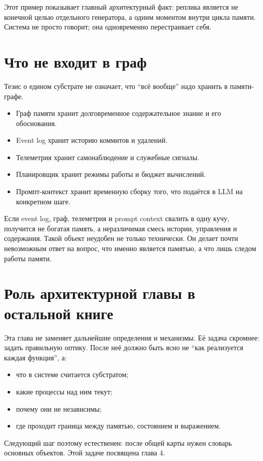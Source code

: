 Этот пример показывает главный архитектурный факт: реплика является не
конечной целью отдельного генератора, а одним моментом внутри цикла памяти.
Система не просто говорит; она одновременно перестраивает себя.

\section{Что не входит в граф}

Тезис о едином субстрате не означает, что ``всё вообще'' надо хранить в
памяти-графе.

\begin{itemize}
\item Граф памяти хранит долговременное содержательное знание и его обоснования.
\item Event log хранит историю коммитов и удалений.
\item Телеметрия хранит самонаблюдение и служебные сигналы.
\item Планировщик хранит режимы работы и бюджет вычислений.
\item Промпт-контекст хранит временную сборку того, что подаётся в LLM на конкретном шаге.
\end{itemize}

\begin{intuition}
Если event log, граф, телеметрия и prompt context свалить в одну кучу,
получится не богатая память, а неразличимая смесь истории, управления и
содержания. Такой объект неудобен не только технически. Он делает почти
невозможным ответ на вопрос, что именно является памятью, а что лишь следом
работы памяти.
\end{intuition}

\section{Роль архитектурной главы в остальной книге}

Эта глава не заменяет дальнейшие определения и механизмы. Её задача скромнее:
задать правильную оптику. После неё должно быть ясно не ``как реализуется
каждая функция'', а:

\begin{itemize}
\item что в системе считается субстратом;
\item какие процессы над ним текут;
\item почему они не независимы;
\item где проходит граница между памятью, состоянием и выражением.
\end{itemize}

Следующий шаг поэтому естественен: после общей карты нужен словарь основных
объектов. Этой задаче посвящена глава 4.
